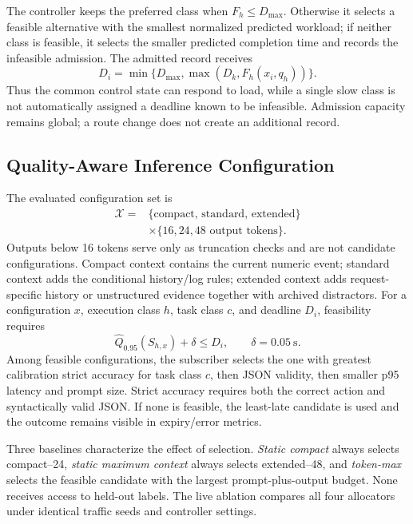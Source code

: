 The controller keeps the preferred class when $F_h\le D_{\max}$. Otherwise it selects a feasible alternative with the smallest normalized predicted workload; if neither class is feasible, it selects the smaller predicted completion time and records the infeasible admission. The admitted record receives
\begin{equation}
 D_i=\min\{D_{\max},\max(D_k,F_h(x_i,q_h))\}.
 \label{eq:record-deadline}
\end{equation}
Thus the common control state can respond to load, while a single slow class is not automatically assigned a deadline known to be infeasible. Admission capacity remains global; a route change does not create an additional record.

\subsection{Quality-Aware Inference Configuration}

The evaluated configuration set is
\begin{equation}
\begin{split}
 \mathcal X={}&\{\text{compact, standard, extended}\}\\
 &\times\{16,24,48\text{ output tokens}\}.
\end{split}
\end{equation}
Outputs below 16 tokens serve only as truncation checks and are not candidate configurations. Compact context contains the current numeric event; standard context adds the conditional history/log rules; extended context adds request-specific history or unstructured evidence together with archived distractors. For a configuration $x$, execution class $h$, task class $c$, and deadline $D_i$, feasibility requires
\begin{equation}
 \widehat Q_{0.95}(S_{h,x})+\delta\le D_i,\qquad \delta=0.05\ \mathrm{s}.
\end{equation}
Among feasible configurations, the subscriber selects the one with greatest calibration strict accuracy for task class $c$, then JSON validity, then smaller p95 latency and prompt size. Strict accuracy requires both the correct action and syntactically valid JSON. If none is feasible, the least-late candidate is used and the outcome remains visible in expiry/error metrics.

Three baselines characterize the effect of selection. \emph{Static compact} always selects compact--24, \emph{static maximum context} always selects extended--48, and \emph{token-max} selects the feasible candidate with the largest prompt-plus-output budget. None receives access to held-out labels. The live ablation compares all four allocators under identical traffic seeds and controller settings.

